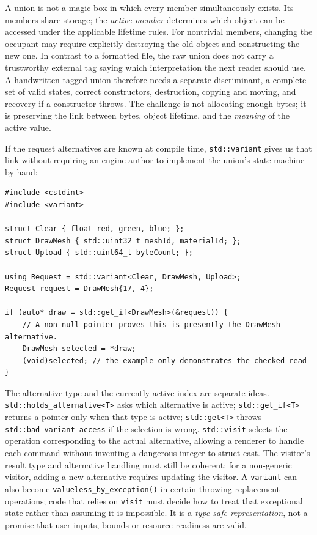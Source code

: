 A union is not a magic box in which every member simultaneously exists. Its members share storage; the \emph{active member} determines which object can be accessed under the applicable lifetime rules. For nontrivial members, changing the occupant may require explicitly destroying the old object and constructing the new one. In contrast to a formatted file, the raw union does not carry a trustworthy external tag saying which interpretation the next reader should use. A handwritten tagged union therefore needs a separate discriminant, a complete set of valid states, correct constructors, destruction, copying and moving, and recovery if a constructor throws. The challenge is not allocating enough bytes; it is preserving the link between bytes, object lifetime, and the \emph{meaning} of the active value.

If the request alternatives are known at compile time, \texttt{std::variant} gives us that link without requiring an engine author to implement the union's state machine by hand:

\begin{verbatim}
#include <cstdint>
#include <variant>

struct Clear { float red, green, blue; };
struct DrawMesh { std::uint32_t meshId, materialId; };
struct Upload { std::uint64_t byteCount; };

using Request = std::variant<Clear, DrawMesh, Upload>;
Request request = DrawMesh{17, 4};

if (auto* draw = std::get_if<DrawMesh>(&request)) {
    // A non-null pointer proves this is presently the DrawMesh alternative.
    DrawMesh selected = *draw;
    (void)selected; // the example only demonstrates the checked read
}
\end{verbatim}

The alternative type and the currently active index are separate ideas. \texttt{std::holds\_alternative\textless{}T\textgreater{}} asks which alternative is active; \texttt{std::get\_if\textless{}T\textgreater{}} returns a pointer only when that type is active; \texttt{std::get\textless{}T\textgreater{}} throws \texttt{std::bad\_variant\_access} if the selection is wrong. \texttt{std::visit} selects the operation corresponding to the actual alternative, allowing a renderer to handle each command without inventing a dangerous integer-to-struct cast. The visitor's result type and alternative handling must still be coherent: for a non-generic visitor, adding a new alternative requires updating the visitor. A \texttt{variant} can also become \texttt{valueless\_by\_exception()} in certain throwing replacement operations; code that relies on \texttt{visit} must decide how to treat that exceptional state rather than assuming it is impossible. It is a \emph{type-safe representation}, not a promise that user inputs, bounds or resource readiness are valid.

